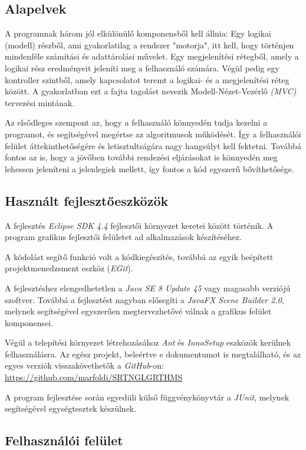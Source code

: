 \documentclass{elteikthesis}
\begin{document}
\subsection{Alapelvek}
A programnak három jól elkülönülő komponensből kell állnia:
Egy logikai (modell) részből, ami gyakorlatilag a rendszer "motorja", itt kell, hogy történjen mindenféle számítási és adattárolási művelet. Egy megjelenítési rétegből, amely a logikai rész eredményeit jeleníti meg a felhasználó számára. Végül pedig egy kontroller szintből, amely kapcsolatot teremt a logikai- és a megjelenítési réteg között. A gyakorlatban ezt a fajta tagolást nevezik Modell-Nézet-Vezérlő \emph{(MVC)} tervezési mintának.\par
Az elsődleges szempont az, hogy a felhasználó könnyedén tudja kezelni a programot, és segítségével megértse az algoritmusok működését. Így a felhasználói felület áttekinthetőségére és letisztultságára nagy hangsúlyt kell fektetni. Továbbá fontos az is, hogy a jövőben további rendezési eljárásokat is könnyedén meg lehessen jeleníteni a jelenlegiek mellett, így fontos a kód egyszerű bővíthetősége.

\subsection{Használt fejlesztőeszközök}
A fejlesztés \emph{Eclipse SDK 4.4} fejlesztői környezet keretei között történik. A program grafikus fejlesztői felületet ad alkalmazások készítéséhez.\par
A kódolást segítő funkció volt a kódkiegészítés, továbbá az egyik beépített projektmenedzsment eszköz (\emph{EGit}).\par
A fejlesztéshez elengedhetetlen a \emph{Java SE 8 Update 45} vagy magasabb verziójú szoftver. Továbbá a fejlesztést nagyban elősegíti a \emph{JavaFX Scene Builder 2.0}, melynek segítségével egyszerűen megtervezhetővé válnak a grafikus felület komponensei.\par
Végül a telepítési környezet létrehozásához \emph{Ant} és \emph{InnoSetup} eszközök kerülnek felhasználásra.
Az egész projekt, beleértve e dokumentumot is megtalálható, és az egyes verziók visszakövethetők a \emph{GitHub}-on: \url{https://github.com/marfoldi/SRTNGLGRTHMS}\par
A program fejlesztése során egyedüli külső függvénykönyvtár a \emph{JUnit}, melynek segítségével egységtesztek készülnek.

\subsection{Felhasználói felület}
\end{document}
